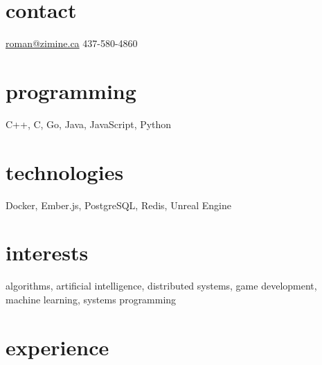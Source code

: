 \documentclass[]{zimine-cv}
\begin{document}

\pagecolor{bgbase1}

\begin{aside}
  \section{contact}
    \href{mailto:roman@zimine.ca}{roman@zimine.ca}
    437-580-4860
  \section{programming}
    C++, C, Go,
    Java, JavaScript,
    Python
  \section{technologies}
    Docker, Ember.js, PostgreSQL, Redis, Unreal Engine
\end{aside}

\section{interests}

algorithms, artificial intelligence, distributed systems, game development,\\
machine learning, systems programming


\section{experience}
\end{document}
